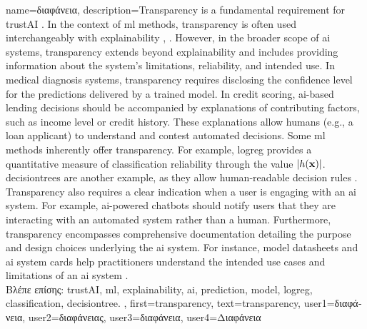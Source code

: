 {name={\foreignlanguage{greek}{διαφάνεια}},
	description={Transparency 
		is a fundamental requirement for \gls{trustAI} \cite{HLEGTrustworhtyAI}. In the context of \gls{ml} 
		methods, transparency is often used interchangeably with \gls{explainability} 
		\cite{JunXML2020}, \cite{gallese2023ai}. However, in the broader scope of \gls{ai} 
		systems, transparency extends beyond \gls{explainability} and includes providing information 
		about the system’s limitations, reliability, and intended use. 
		In medical diagnosis systems, transparency requires disclosing the confidence level 
		for the \gls{prediction}s delivered by a trained \gls{model}. In credit scoring, 
		\gls{ai}-based lending decisions should be accompanied by explanations of 
		contributing factors, such as income level or credit history. These explanations 
		allow humans (e.g., a loan applicant) to understand and contest automated decisions. 
		Some \gls{ml} methods inherently offer transparency. For example, \gls{logreg} 
		provides a quantitative measure of \gls{classification} reliability through the value $|h({\bf x})|$. 
		\Gls{decisiontree}s are another example, as they allow human-readable decision rules \cite{rudin2019stop}.
		Transparency also requires a clear indication when a user is engaging with an \gls{ai} system. 
		For example, \gls{ai}-powered chatbots should notify users that they are interacting with an 
		automated system rather than a human. Furthermore, transparency encompasses comprehensive 
		documentation detailing the purpose and design choices underlying the \gls{ai} system. 
		For instance, \gls{model} datasheets \cite{DatasheetData2021} and \gls{ai} system cards \cite{10.1145/3287560.3287596} 
		help practitioners understand the intended use cases and limitations of an \gls{ai} system \cite{Shahriari2017}.\\
		\foreignlanguage{greek}{Βλέπε επίσης:} \gls{trustAI}, \gls{ml}, \gls{explainability}, \gls{ai}, \gls{prediction}, \gls{model}, \gls{logreg}, 
		\gls{classification}, \gls{decisiontree}. },
	first={transparency}, 
	text={transparency},
	user1={\foreignlanguage{greek}{διαφάνεια}}, %
    	user2={\foreignlanguage{greek}{διαφάνειας}}, %
	user3={\foreignlanguage{greek}{διαφάνεια}}, %
	user4={\foreignlanguage{greek}{Διαφάνεια}} %
}

